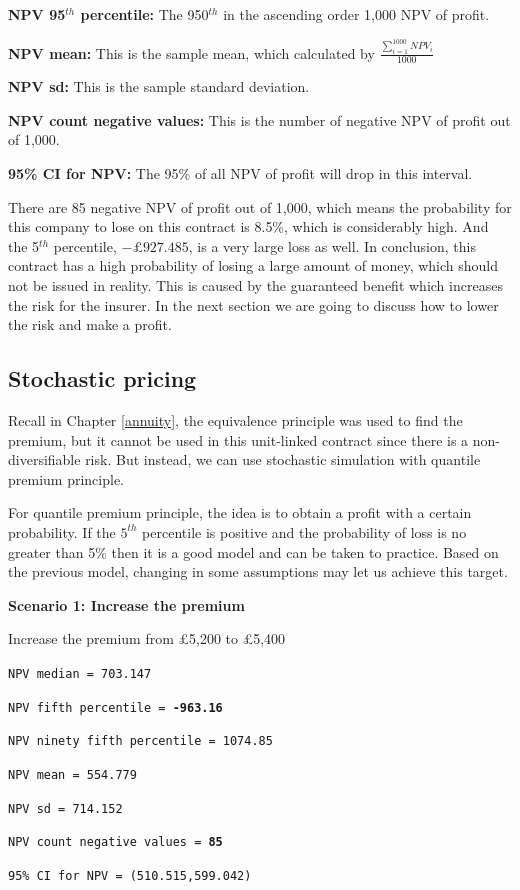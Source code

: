 \documentclass{report}
\begin{document}
\textbf{NPV 95$^{th}$ percentile:} The 950$^{th}$ in the ascending order 1,000 NPV of profit.

\textbf{NPV mean:} This is the sample mean, which calculated by $\frac{\sum_{i=1}^{1000} NPV_i}{1000}$

\textbf{NPV sd:} This is the sample standard deviation. 

\textbf{NPV count negative values:} This is the number of negative NPV of profit out of 1,000.

\textbf{95\% CI for NPV:} The 95\% of all NPV of profit will drop in this interval.


There are 85 negative NPV of profit out of 1,000, which means the probability for this company to lose on this contract is 8.5\%, which is considerably high. And the 5$^{th}$ percentile, ${-\pounds927.485}$, is a very large loss as well. In conclusion, this contract has a high probability of losing a large amount of money, which should not be issued in reality. This is caused by the guaranteed benefit which increases the risk for the insurer. In the next section we are going to discuss how to lower the risk and make a profit.


\subsection{Stochastic pricing}

Recall in Chapter \ref{annuity}, the equivalence principle was used to find the premium, but it cannot be used in this unit-linked contract since there is a non-diversifiable risk. But instead, we can use stochastic simulation with quantile premium principle\cite{bib:quantile-premium}. 

For quantile premium principle, the idea is to obtain a profit with a certain probability. If the $5^{th}$ percentile is positive and the probability of loss is no greater than 5\% then it is a good model and can be taken to practice. Based on the previous model, changing in some assumptions may let us achieve this target. 

\textbf{Scenario 1: Increase the premium}

Increase the premium from \pounds5,200 to \pounds5,400

\texttt{NPV median = 703.147}

{\renewcommand\baselinestretch{1}\selectfont

\texttt{NPV fifth percentile = \textbf{-963.16}}

\texttt{NPV ninety fifth percentile = 1074.85}

\texttt{NPV mean = 554.779}

\texttt{NPV sd = 714.152}

\texttt{NPV count negative values = \textbf{85}}

\texttt{95\% CI for NPV = (510.515,599.042)}

\par}
\end{document}
